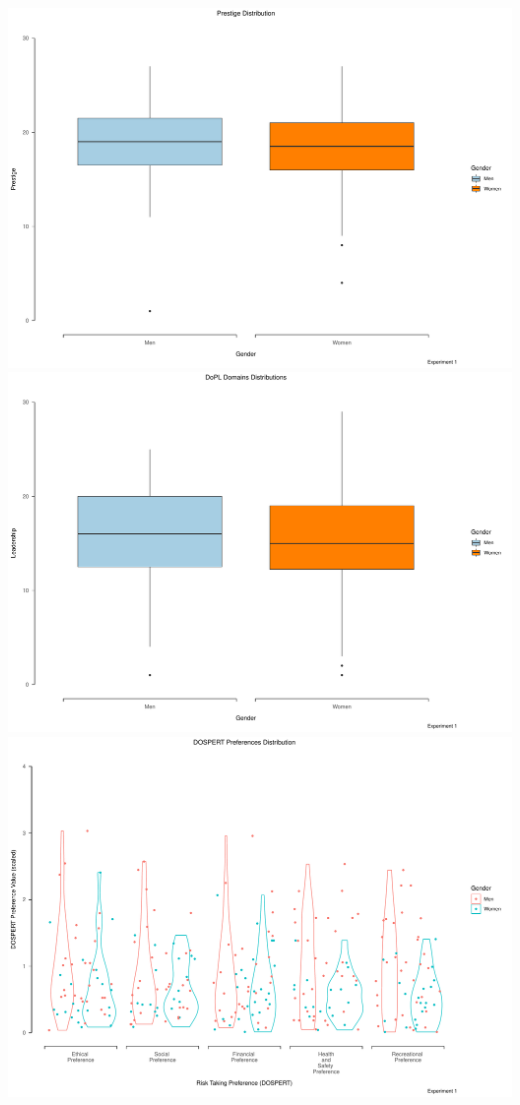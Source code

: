 \documentclass[
  donotrepeattitle,doc, 12pt, a4paper,floatsintext]{apa7}
\begin{document}
\includegraphics{Output_Files/DoPL-Experiment_files/figure-latex/PrestigeExperiment1-1.pdf}
\includegraphics{Output_Files/DoPL-Experiment_files/figure-latex/LeadershipExperiment1-1.pdf}
\includegraphics{Output_Files/DoPL-Experiment_files/figure-latex/DOSPERT-Preferences-GenderExperiment1-1.pdf}
\end{document}
